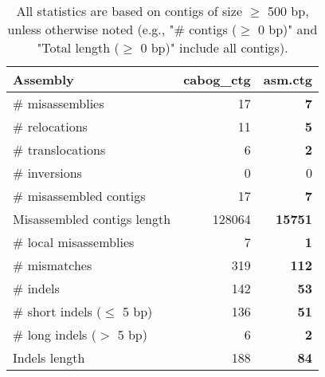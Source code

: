 \documentclass[12pt,a4paper]{article}
\begin{document}
\begin{table}[ht]
\begin{center}
\caption{All statistics are based on contigs of size $\geq$ 500 bp, unless otherwise noted (e.g., "\# contigs ($\geq$ 0 bp)" and "Total length ($\geq$ 0 bp)" include all contigs).}
\begin{tabular}{|l*{2}{|r}|}
\hline
Assembly & cabog\_ctg & asm.ctg \\ \hline
\# misassemblies & 17 & {\bf 7} \\ \hline
\hspace{5mm}\# relocations & 11 & {\bf 5} \\ \hline
\hspace{5mm}\# translocations & 6 & {\bf 2} \\ \hline
\hspace{5mm}\# inversions & 0 & 0 \\ \hline
\# misassembled contigs & 17 & {\bf 7} \\ \hline
Misassembled contigs length & 128064 & {\bf 15751} \\ \hline
\# local misassemblies & 7 & {\bf 1} \\ \hline
\# mismatches & 319 & {\bf 112} \\ \hline
\# indels & 142 & {\bf 53} \\ \hline
\hspace{5mm}\# short indels ($\leq$ 5 bp) & 136 & {\bf 51} \\ \hline
\hspace{5mm}\# long indels ($>$ 5 bp) & 6 & {\bf 2} \\ \hline
Indels length & 188 & {\bf 84} \\ \hline
\end{tabular}
\end{center}
\end{table}
\end{document}
